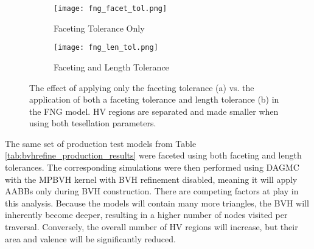 \begin{figure}[H]
  \begin{subfigure}[t]{0.48\textwidth}
    \centering
    \texttt{[image: fng\_facet\_tol.png]}
    \caption{Faceting Tolerance Only}
  \end{subfigure}
  \hfill
  \begin{subfigure}[t]{0.48\textwidth}
    \centering
    \texttt{[image: fng\_len\_tol.png]}
    \caption{Faceting and Length Tolerance}
  \end{subfigure}
  \caption[Length tolerance faceting example.]{The effect of applying only the
    faceting tolerance (a) vs. the application of both a faceting tolerance and
    length tolerance (b) in the FNG model. HV regions are separated and made
    smaller when using both tesellation parameters.}
  \label{fig:fng_ft-lt}
\end{figure}

The same set of production test models from Table
\ref{tab:bvhrefine_production_results} were faceted using both faceting and
length tolerances. The corresponding simulations were then performed using DAGMC
with the MPBVH kernel with BVH refinement disabled, meaning it will apply AABBs
only during BVH construction. There are competing factors at play in this
analysis. Because the models will contain many more triangles, the BVH will
inherently become deeper, resulting in a higher number of nodes visited per
traversal. Conversely, the overall number of HV regions will increase, but their
area and valence will be significantly reduced.

\begin{sidewaystable}[p]
  \centering
  \caption[Length tolerance production model study.]{The results of production
    model simulations when applying both a faceting tolerance and length
    tolerance during model tessellation to reduce HV region severity.}
  \label{tab:length_tol_production_study}
\end{sidewaystable}

